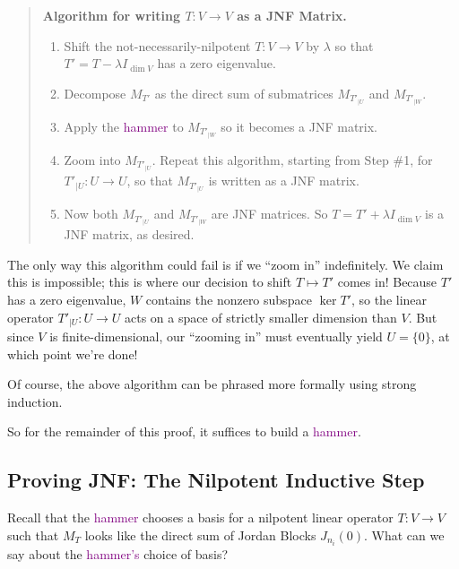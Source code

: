 \begin{quote}

    \textbf{Algorithm for writing $T: V \to V$ as a JNF Matrix.}

\begin{enumerate}
    \item Shift the not-necessarily-nilpotent $T: V \to V$ by $\lambda$ so that $T' = T - \lambda I_{\dim V}$ has a zero eigenvalue.
    \item Decompose $M_{T'}$ as the direct sum of submatrices $M_{T'_{|U}}$ and $M_{T'_{|W}}$.
    \item Apply the \textcolor{purple}{hammer} to $M_{T'_{|W}}$ so it becomes a JNF matrix.
    \item Zoom into $M_{T'_{|U}}$.  Repeat this algorithm, starting from Step \#1, for $T'_{|U}: U \to U$, so that $M_{T'_{|U}}$ is written as a JNF matrix.
    \item Now both $M_{T'_{|U}}$ and $M_{T'_{|W}}$ are JNF matrices.  So $T = T' + \lambda I_{\dim V}$ is a JNF matrix, as desired.
\end{enumerate}

\end{quote}

The only way this algorithm could fail is if we ``zoom in'' indefinitely.  We claim this is impossible; this is where our decision to shift $T \mapsto T'$ comes in!  Because $T'$ has a zero eigenvalue, $W$ contains the nonzero subspace $\ker T'$, so the linear operator $T'_{|U}: U \to U$ acts on a space of strictly smaller dimension than $V$.  But since $V$ is finite-dimensional, our ``zooming in'' must eventually yield $U = \{0\}$, at which point we're done!

\begin{remark}
    Of course, the above algorithm can be phrased more formally using strong induction.
\end{remark}

So for the remainder of this proof, it suffices to build a \textcolor{purple}{hammer}.

\subsection{Proving JNF: The Nilpotent Inductive Step}

Recall that the \textcolor{purple}{hammer} chooses a basis for a nilpotent linear operator $T: V \to V$ such that $M_T$ looks like the direct sum of Jordan Blocks $J_{n_i}(0)$.  What can we say about the \textcolor{purple}{hammer's} choice of basis?

